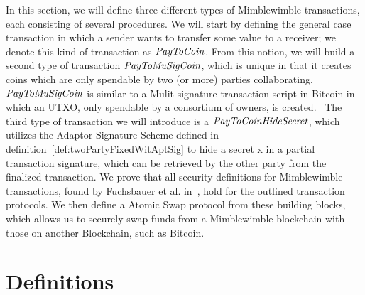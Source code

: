 In this section, we will define three different types of Mimblewimble transactions, each consisting of several procedures.
We will start by defining the general case transaction in which a sender wants to transfer some value to a receiver; we denote this kind of transaction as $\mathit{PayToCoin}$. From this notion,
we will build a second type of transaction $\mathit{PayToMuSigCoin}$, which is unique in that it creates coins which are only spendable by two (or more) parties collaborating. $\mathit{PayToMuSigCoin}$ is similar
to a Mulit-signature transaction script in Bitcoin in which an UTXO, only spendable by a consortium of owners, is created.~\cite{bistarelli2018analysis}
The third type of transaction we will introduce is a $\mathit{PayToCoinHideSecret}$, which utilizes the Adaptor Signature Scheme defined in definition~\ref{def:twoPartyFixedWitAptSig} to hide a secret x in a
partial transaction signature, which can be retrieved by the other party from the finalized transaction.
We prove that all security definitions for Mimblewimble transactions, found by Fuchsbauer et al. in~\cite{fuchsbauer2019aggregate}, hold for the outlined transaction protocols.
We then define a Atomic Swap protocol from these building blocks, which allows us to securely swap funds from a Mimblewimble blockchain with those on another Blockchain, such as Bitcoin.

\section{Definitions}\label{sec:atomic-def}

